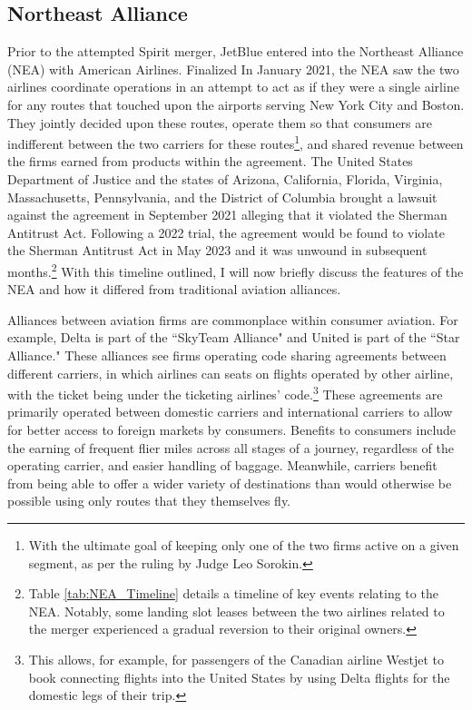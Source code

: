 \documentclass{article}
\let\Oldsubsection\subsection
\renewcommand{\subsection}{\FloatBarrier\Oldsubsection}
\begin{document}
	\subsection{Northeast Alliance}
	\label{sec:Setting_NEA}
	
	Prior to the attempted Spirit merger, JetBlue entered into the Northeast Alliance (NEA) with American Airlines. Finalized In January 2021, the NEA saw the two airlines coordinate operations in an attempt to act as if they were a single airline for any routes that touched upon the airports serving New York City and Boston. They jointly decided upon these routes, operate them so that consumers are indifferent between the two carriers for these routes\footnote{With the ultimate goal of keeping only one of the two firms active on a given segment, as per the ruling by Judge Leo Sorokin.}, and shared revenue between the firms earned from products within the agreement. The United States Department of Justice and the states of Arizona, California, Florida, Virginia, Massachusetts, Pennsylvania, and the District of Columbia brought a lawsuit against the agreement in September 2021 alleging that it violated the Sherman Antitrust Act.  Following a 2022 trial, the agreement would be found to violate the Sherman Antitrust Act in May 2023 and it was unwound in subsequent months\citep{rennison_jetblue-american_2023, rains_what_2023}.\footnote{Table \ref{tab:NEA_Timeline} details a timeline of key events relating to the NEA. Notably, some landing slot leases between the two airlines related to the merger experienced a gradual reversion to their original owners.} With this timeline outlined, I will now briefly discuss the features of the NEA and how it differed from traditional aviation alliances. 
	
	Alliances between aviation firms are commonplace within consumer aviation. For example, Delta is part of the ``SkyTeam Alliance" and United is part of the ``Star Alliance." These alliances see firms operating code sharing agreements between different carriers, in which airlines can seats on flights operated by other airline, with the ticket being under the ticketing airlines' code.\footnote{This allows, for example, for passengers of the Canadian airline Westjet to book connecting flights into the United States by using Delta flights for the domestic legs of their trip.}  These agreements are primarily operated between domestic carriers and international carriers to allow for better access to foreign markets by consumers. Benefits to consumers include the earning of frequent flier miles across all stages of a journey, regardless of the operating carrier, and easier handling of baggage. Meanwhile, carriers benefit from being able to offer a wider variety of destinations than would otherwise be possible using only routes that they themselves fly.
	
\end{document}
